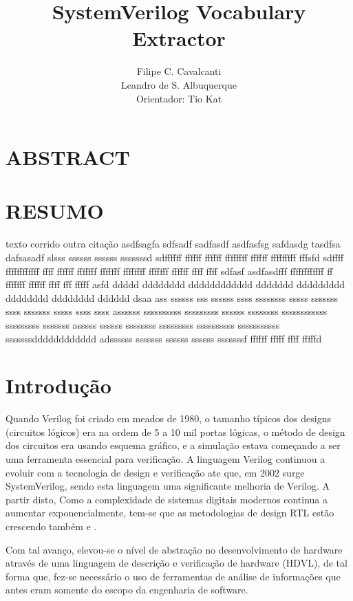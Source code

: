 \documentclass[12pt, twocolumn, a4paper]{article}
\begin{document}
	\title{SystemVerilog Vocabulary Extractor}
	\author{Filipe C. Cavalcanti\\ Leandro de S. Albuquerque\\
	Orientador: Tio Kat}
	\maketitle
	
	\section{ABSTRACT}
	
	\section{RESUMO}
	\quad texto corrido\cite{Antoniol2007}
	outra citação\cite{Alfke1943}
	asdfsagfa sdfsadf sadfasdf asdfasfsg
	safdasdg tasdfsa dafsasadf slsss ssssss ssssss sssssssd
	sdffffff ffffff ffffff ffffffff ffffff fffffffff fffsfd
	sdffff ffffffffffff ffff ffffff fffffff fffffff ffffffff fffffff ffffff ffff ffff
	sdfasf asdfasdfff ffffffffffff ff fffffff ffffff ffff fff fffff
	asfd ddddd dddddddd dddddddddddd ddddddd ddddddddd dddddddd dddddddd dddddd
	dsaa ass ssssss sss ssssss ssss ssssssss sssss sssssss ssss sssssss sssss ssss ssss
	assssss ssssssssss sssssssss ssssss ssssssss ssssssssssss sssssssss sssssss
	asssss ssssss ssssssss sssssssss ssssssssss sssssssssss sssssssdddddddddddd
	adssssss sssssss ssssss ssssss sssssssf ffffff fffff ffff fffffd
	
	
	\section{Introdução}
\quad Quando Verilog foi criado em meados de 1980, o tamanho típicos dos designs (circuitos lógicos) era na ordem de 5 a 10 mil portas lógicas, o método de design dos circuitos era usando esquema gráfico, e a simulação estava começando a ser uma ferramenta essencial para verificação\cite{sutherland2006}. A linguagem Verilog continuou a evoluir com a tecnologia de design e verificação ate que, em 2002 surge SystemVerilog, sendo esta linguagem uma significante melhoria de Verilog\cite{sutherland2006}. A partir disto, Como a complexidade de sistemas digitais modernos continua a aumentar exponencialmente, tem-se que as metodologias de design RTL estão crescendo também\cite{Marc-Andre} e \cite{Hahanov2008}.

Com tal avanço, elevou-se o nível de abstração no desenvolvimento de hardware através de uma linguagem de descrição e verificação de hardware (HDVL), de tal forma que, fez-se necessário o uso de ferramentas de análise de informações que antes eram somente do escopo da engenharia de software.
\end{document}
